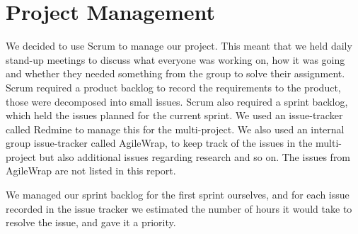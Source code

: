\section{Project Management}\label{spr1_projmana}
We decided to use Scrum to manage our project. This meant that we held daily stand-up meetings to discuss what everyone was working on, how it was going and whether they needed something from the group to solve their assignment. Scrum required a product backlog to record the requirements to the product, those were decomposed into small issues. Scrum also required a sprint backlog, which held the issues planned for the current sprint. We used an issue-tracker called Redmine to manage this for the multi-project. We also used an internal group issue-tracker called AgileWrap, to keep track of the issues in the multi-project but also additional issues regarding research and so on. The issues from AgileWrap are not listed in this report.

We managed our sprint backlog for the first sprint ourselves, and for each issue recorded in the issue tracker we estimated the number of hours it would take to resolve the issue, and gave it a priority.
